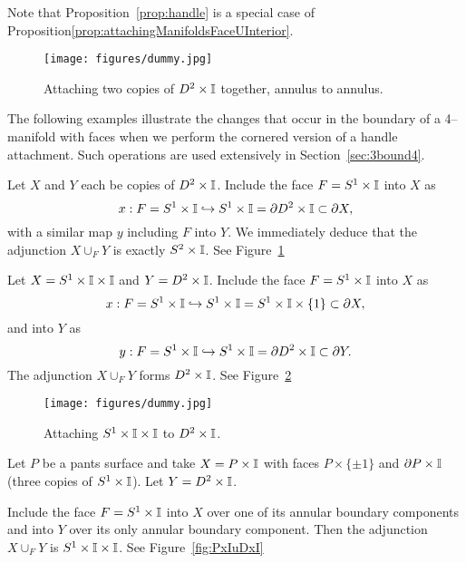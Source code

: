 Note that Proposition~\ref{prop:handle} is a special case of Proposition\ref{prop:attachingManifoldsFaceUInterior}.

\begin{figure}[H]
	\centering
	\caption{Attaching two copies of $D^2\times\mathbb{I}$ together, annulus to annulus.}
	\texttt{[image: figures/dummy.jpg]}
	\label{fig:DxIuDxI}
\end{figure}

The following examples illustrate the changes that occur in the boundary of a 4--manifold with faces when we perform the cornered version of a handle attachment.
Such operations are used extensively in Section~\ref{sec:3bound4}.

\begin{ex}
	\label{ex:DxIuDxI}
	Let $X$ and $Y$ each be copies of $D^2\times\mathbb{I}$.
	Include the face $F=S^1\times\mathbb{I}$ into $X$ as
	\[
	x:F= S^1\times\mathbb{I}\hookrightarrow S^1\times\mathbb{I}=\partial D^2 \times\mathbb{I}\subset \partial X,
	\]
	with a similar map $y$ including $F$ into $Y$.
	We immediately deduce that the adjunction $X\cup_F Y$ is exactly $S^2\times\mathbb{I}$.
	See Figure~\ref{fig:DxIuDxI}
\end{ex}

\begin{ex}
	\label{ex:AxIuDxI}
	Let $X=S^1\times\mathbb{I}\times\mathbb{I}$ and $Y=D^2\times\mathbb{I}$.
	Include the face $F=S^1\times\mathbb{I}$ into $X$ as
	\[
		x:F= S^1\times\mathbb{I} \hookrightarrow S^1\times\mathbb{I}=S^1 \times\mathbb{I}\times\{1\}\subset \partial X,
	\]
	and into $Y$ as
	\[
		y:F= S^1\times\mathbb{I}\hookrightarrow S^1\times\mathbb{I}=\partial D^2 \times\mathbb{I}\subset \partial Y.
	\]
	The adjunction $X\cup_F Y$ forms $D^2\times\mathbb{I}$.
	See Figure~\ref{fig:AxIuDxI}
\end{ex}

\begin{figure}[H]
	\centering
	\caption{Attaching $S^1\times\mathbb{I}\times\mathbb{I}$ to $D^2\times\mathbb{I}$.}
	\texttt{[image: figures/dummy.jpg]}
	\label{fig:AxIuDxI}
\end{figure}

\begin{ex}
	\label{ex:PxIuDxI}
	Let $P$ be a pants surface and take $X=P\times\mathbb{I}$ with faces $P\times\{\pm 1\}$ and $\partial P\times\mathbb{I}$ (three copies of $S^1\times \mathbb{I}$).
	Let $Y=D^2\times\mathbb{I}$.
	
	Include the face $F=S^1\times\mathbb{I}$ into $X$ over one of its annular boundary components and into $Y$ over its only annular boundary component.
	Then the adjunction $X\cup_F Y$ is $ S^1\times\mathbb{I}\times\mathbb{I} $.
	See Figure~\ref{fig:PxIuDxI}
\end{ex}

